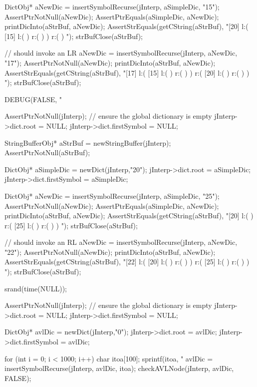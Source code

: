   DictObj* aNewDic = insertSymbolRecurse(jInterp, aSimpleDic, "15");
  AssertPtrNotNull(aNewDic);
  AssertPtrEquals(aSimpleDic, aNewDic);
  printDicInto(aStrBuf, aNewDic);
  AssertStrEquals(getCString(aStrBuf),
  "[20] l:( [15] l:(  ) r:(  )  ) r:(  ) ");
  strBufClose(aStrBuf);
  
  // should invoke an LR
  aNewDic = insertSymbolRecurse(jInterp, aNewDic, "17");
  AssertPtrNotNull(aNewDic);
  printDicInto(aStrBuf, aNewDic);
  AssertStrEquals(getCString(aStrBuf),
  "[17] l:( [15] l:(  ) r:(  )  ) r:( [20] l:(  ) r:(  )  ) ");
  strBufClose(aStrBuf);
\stopCTest
\stopTestCase


\startCTest
  DEBUG(FALSE, "\n%

  AssertPtrNotNull(jInterp);
  // ensure the global dictionary is empty
  jInterp->dict.root        = NULL;
  jInterp->dict.firstSymbol = NULL;

  StringBufferObj* aStrBuf = newStringBuffer(jInterp);
  AssertPtrNotNull(aStrBuf);
  
  DictObj* aSimpleDic = newDict(jInterp,"20");
  jInterp->dict.root        = aSimpleDic;
  jInterp->dict.firstSymbol = aSimpleDic;

  DictObj* aNewDic = insertSymbolRecurse(jInterp, aSimpleDic, "25");
  AssertPtrNotNull(aNewDic);
  AssertPtrEquals(aSimpleDic, aNewDic);
  printDicInto(aStrBuf, aNewDic);
  AssertStrEquals(getCString(aStrBuf),
  "[20] l:(  ) r:( [25] l:(  ) r:(  )  ) ");
  strBufClose(aStrBuf);
  
  // should invoke an RL
  aNewDic = insertSymbolRecurse(jInterp, aNewDic, "22");
  AssertPtrNotNull(aNewDic);
  printDicInto(aStrBuf, aNewDic);
  AssertStrEquals(getCString(aStrBuf),
  "[22] l:( [20] l:(  ) r:(  )  ) r:( [25] l:(  ) r:(  )  ) ");
  strBufClose(aStrBuf);
\stopCTest
\stopTestCase

\startCTest

  srand(time(NULL));

  AssertPtrNotNull(jInterp);
  // ensure the global dictionary is empty
  jInterp->dict.root        = NULL;
  jInterp->dict.firstSymbol = NULL;

  DictObj* avlDic = newDict(jInterp,"0");
  jInterp->dict.root        = avlDic;
  jInterp->dict.firstSymbol = avlDic;

  for (int i = 0; i < 1000; i++) {
    char itoa[100];
    sprintf(itoa, "%
    avlDic = insertSymbolRecurse(jInterp, avlDic, itoa);
  }
  checkAVLNode(jInterp, avlDic, FALSE);

